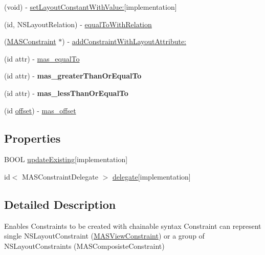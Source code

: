 \begin{DoxyCompactItemize}
\item 
(void) -\/ \mbox{\hyperlink{interface_m_a_s_constraint_a525bc5fb4cf23a6106155ffbcd774a4b}{set\+Layout\+Constant\+With\+Value\+:}}{\ttfamily  \mbox{[}implementation\mbox{]}}
\item 
(id, N\+S\+Layout\+Relation) -\/ \mbox{\hyperlink{interface_m_a_s_constraint_a06df7a7cb2a7c3e32197800487d8d927}{equal\+To\+With\+Relation}}
\item 
(\mbox{\hyperlink{interface_m_a_s_constraint}{M\+A\+S\+Constraint}} $\ast$) -\/ \mbox{\hyperlink{interface_m_a_s_constraint_a432981551ebd6025204a33e5e4676c97}{add\+Constraint\+With\+Layout\+Attribute\+:}}
\item 
(id attr) -\/ \mbox{\hyperlink{interface_m_a_s_constraint_a3a362a9fa62f0adae01eb60b6a8508d1}{mas\+\_\+equal\+To}}
\item 
\mbox{\label{interface_m_a_s_constraint_a847c1ec2da5932ca254650988d5be36a}} 
(id attr) -\/ {\bfseries mas\+\_\+greater\+Than\+Or\+Equal\+To}
\item 
\mbox{\label{interface_m_a_s_constraint_aecd1a44827900ac4119b6b9c5c5f5eb0}} 
(id attr) -\/ {\bfseries mas\+\_\+less\+Than\+Or\+Equal\+To}
\item 
(id \mbox{\hyperlink{interface_m_a_s_constraint_a9fc79ce794fd6b4bf204fcd8e6d07345}{offset}}) -\/ \mbox{\hyperlink{interface_m_a_s_constraint_aa1b8cf5bbeff5df1ab0d89fb95d31fe9}{mas\+\_\+offset}}
\end{DoxyCompactItemize}
\subsection*{Properties}
\begin{DoxyCompactItemize}
\item 
B\+O\+OL \mbox{\hyperlink{interface_m_a_s_constraint_aa3b903bceef8ceeb5c5f39d6b7690f3a}{update\+Existing}}{\ttfamily  \mbox{[}implementation\mbox{]}}
\item 
id$<$ M\+A\+S\+Constraint\+Delegate $>$ \mbox{\hyperlink{interface_m_a_s_constraint_a70e5195d18c9e75c8b226904ddc2d285}{delegate}}{\ttfamily  \mbox{[}implementation\mbox{]}}
\end{DoxyCompactItemize}


\subsection{Detailed Description}
Enables Constraints to be created with chainable syntax Constraint can represent single N\+S\+Layout\+Constraint (\mbox{\hyperlink{interface_m_a_s_view_constraint}{M\+A\+S\+View\+Constraint}}) or a group of N\+S\+Layout\+Constraints (M\+A\+S\+Composiste\+Constraint) 

